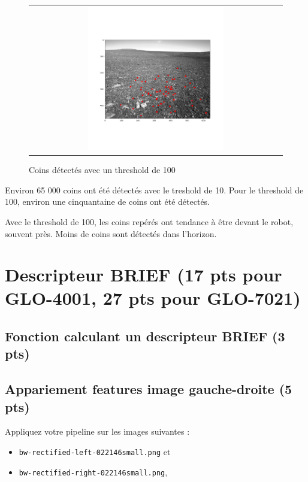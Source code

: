 \documentclass[12pt]{article}
\begin{document}
\begin{figure}[ht]
 \begin{center}
  \begin{tabular}{c}
    \includegraphics[width=0.55\textwidth]{q4-detection-keypoint.png}
  \end{tabular}
 \end{center}
\vspace{-0.25in}
 \caption{Coins d\'etect\'es avec un threshold de 100}
    \label{detection-coin-100}
\end{figure}

Environ 65 000 coins ont \'et\'e d\'etect\'es avec le treshold de 10.
Pour le threshold de 100, environ une cinquantaine de coins ont \'et\'e d\'etect\'es.

Avec le threshold de 100, les coins rep\'er\'es ont tendance \`a \^etre devant le robot, souvent pr\`es.
Moins de coins sont d\'etect\'es dans l'horizon.

\newpage
\section{Descripteur BRIEF (17 pts pour GLO-4001, 27 pts pour GLO-7021)}

\subsection{Fonction calculant un descripteur BRIEF (3 pts)}

\subsection{Appariement features image gauche-droite (5 pts)}
 Appliquez votre pipeline sur les images suivantes :
 \begin{itemize}
 \item \texttt{bw-rectified-left-022146small.png} et
 \item \texttt{bw-rectified-right-022146small.png},
 \end{itemize}
\end{document}
